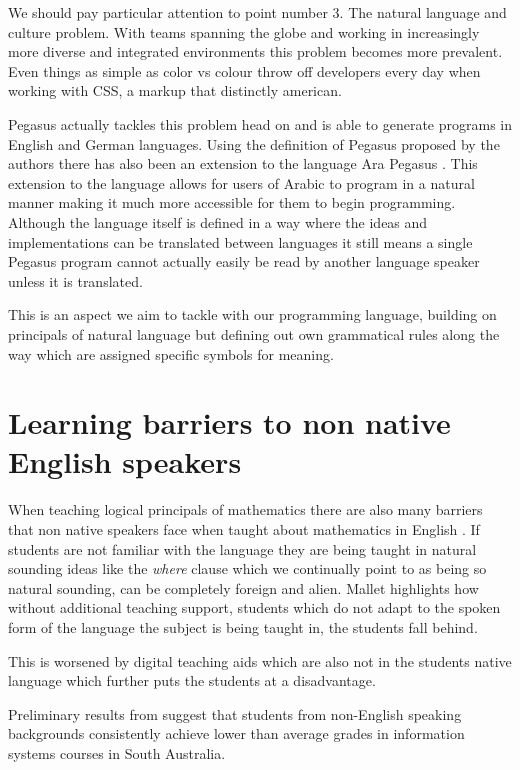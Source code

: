 \documentclass[12pt]{article}
\begin{document}
We should pay particular attention to point number 3. The natural language and culture problem. With teams spanning the globe and working in increasingly more diverse and integrated environments
this problem becomes more prevalent. Even things as simple as color vs colour throw off developers every day when working with CSS, a markup that distinctly american.

Pegasus actually tackles this problem head on and is able to generate programs in English and German languages.
Using the definition of Pegasus proposed by the authors there has also been an extension to the language
Ara Pegasus \parencite{mefteh2012ara_pegasus}. This extension to the language allows for users of Arabic to program
in a natural manner making it much more accessible for them to begin programming. Although the language
itself is defined in a way where the ideas and implementations can be translated between languages it still means a single
Pegasus program cannot actually easily be read by another language speaker unless it is translated.

This is an aspect we aim to tackle with our programming language, building on principals of natural language but
defining out own grammatical rules along the way which are assigned specific symbols for meaning.


\section{Learning barriers to non native English speakers}

When teaching logical principals of mathematics there are also many barriers that non native speakers
face when taught about mathematics in English \parencite{mallet_g._2010}. If students are not familiar
with the language they are being taught in natural sounding ideas like the \emph{where} clause which we
continually point to as being so natural sounding, can be completely foreign and alien. Mallet highlights
how without additional teaching support, students which do not adapt to the spoken form of the language
the subject is being taught in, the students fall behind.

This is worsened by digital teaching aids which are also not in the students native language which further
puts the students at a disadvantage.

Preliminary results from \parencite{bretag2002developing} suggest that students from non-English speaking backgrounds
consistently achieve lower than average grades in information systems courses in South Australia.
\end{document}
